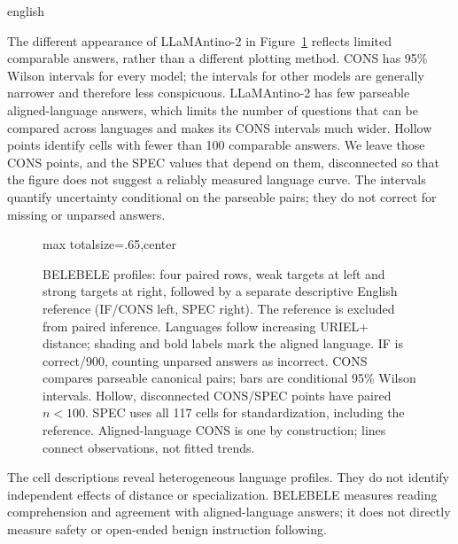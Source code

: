 \begin{otherlanguage*}{english}
\begin{figure}[p]
\end{figure}
The different appearance of LLaMAntino-2 in Figure~\ref{fig:belebele-profiles} reflects limited comparable answers, rather than a different plotting method. CONS has 95\% Wilson intervals for every model; the intervals for other models are generally narrower and therefore less conspicuous. LLaMAntino-2 has few parseable aligned-language answers, which limits the number of questions that can be compared across languages and makes its CONS intervals much wider. Hollow points identify cells with fewer than 100 comparable answers. We leave those CONS points, and the SPEC values that depend on them, disconnected so that the figure does not suggest a reliably measured language curve. The intervals quantify uncertainty conditional on the parseable pairs; they do not correct for missing or unparsed answers.

\begin{figure}[p]\centering
\begin{adjustbox}{max totalsize={\linewidth}{.65\textheight},center}\end{adjustbox}
\caption[BELEBELE IF, CONS and SPEC profiles by model]{BELEBELE profiles: four paired rows, weak targets at left and strong targets at right, followed by a separate descriptive English reference (IF/CONS left, SPEC right). The reference is excluded from paired inference. Languages follow increasing URIEL+ distance; shading and bold labels mark the aligned language. IF is correct/900, counting unparsed answers as incorrect. CONS compares parseable canonical pairs; bars are conditional 95\% Wilson intervals. Hollow, disconnected CONS/SPEC points have paired $n<100$. SPEC uses all 117 cells for standardization, including the reference. Aligned-language CONS is one by construction; lines connect observations, not fitted trends.}\label{fig:belebele-profiles}
\end{figure}


The cell descriptions reveal heterogeneous language profiles. They do not identify independent effects of distance or specialization. BELEBELE measures reading comprehension and agreement with aligned-language answers; it does not directly measure safety or open-ended benign instruction following.


\end{otherlanguage*}
